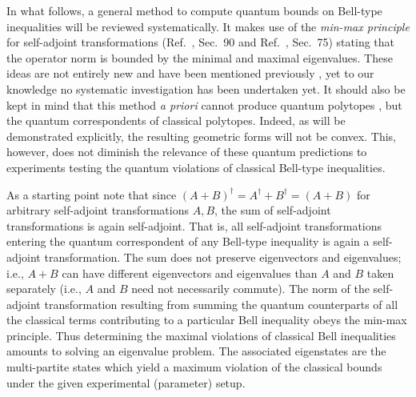 \documentclass[prl,showpacs,showkeys,amsfonts,amsmath,twocolumn]{revtex4}
\begin{document}
In what follows,
a general method to compute quantum bounds on Bell-type inequalities
will be reviewed systematically.
It makes use of the {\em min-max principle} for self-adjoint transformations
(Ref.~\cite{halmos-vs}, Sec.~90 and  Ref.~\cite{reed-sim4}, Sec.~75)
stating that the operator norm is bounded by the minimal and maximal eigenvalues.
These ideas are not entirely new and have been mentioned previously
\cite{werner-wolf-2001,filipp-svo-04-qpoly,cabello-2003a},
yet to our knowledge no systematic investigation has been undertaken yet.
It should also be kept in mind that this method {\it a priori}
cannot produce quantum polytopes \cite{pit:range-2001,filipp-svo-04-qpoly},
but the quantum correspondents of classical polytopes.
Indeed, as will be demonstrated explicitly, the resulting geometric forms will not be convex.
This, however,
does not diminish the relevance of these quantum predictions
to experiments testing the quantum violations
of classical Bell-type inequalities.

As a starting point note that
since $(A+B)^\dagger =A^\dagger +B^\dagger = (A+B)$ for arbitrary self-adjoint transformations $A,B$,
the sum of self-adjoint transformations is again self-adjoint.
That is, all self-adjoint transformations entering the quantum correspondent of any Bell-type inequality
is again a self-adjoint transformation.
The sum does not preserve eigenvectors and eigenvalues;
i.e., $A+B$ can have different eigenvectors and eigenvalues than $A$ and $B$ taken separately
(i.e., $A$ and $B$ need not necessarily commute).
The norm of the self-adjoint transformation resulting from summing the quantum counterparts
of all the classical terms contributing to a particular Bell inequality obeys the min-max principle.
Thus determining the maximal violations of classical Bell inequalities amounts to
solving an eigenvalue problem.
The associated eigenstates are the multi-partite states which yield a maximum violation
of the classical bounds under the given experimental (parameter) setup.
\end{document}
